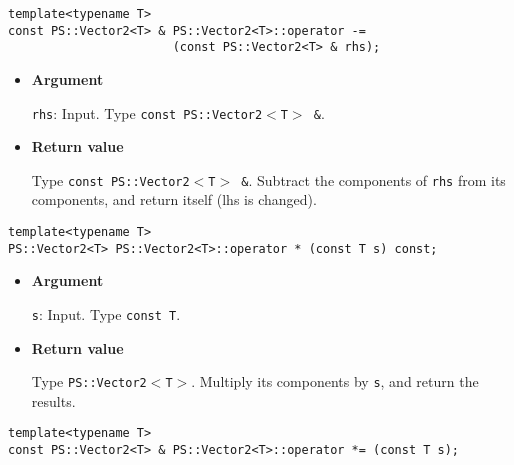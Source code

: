 \begin{screen}
\begin{verbatim}
template<typename T>
const PS::Vector2<T> & PS::Vector2<T>::operator -= 
                       (const PS::Vector2<T> & rhs);
\end{verbatim}
\end{screen}

\begin{itemize}

\item{{\bf Argument}}

\texttt{rhs}: Input. Type \texttt{const PS::Vector2$<$T$>$ \&}.

\item{{\bf Return value}}

Type \texttt{const PS::Vector2$<$T$>$ \&}. Subtract the components of \texttt{rhs} from
its components, and return itself (lhs is changed).

\end{itemize}


\begin{screen}
\begin{verbatim}
template<typename T>
PS::Vector2<T> PS::Vector2<T>::operator * (const T s) const;
\end{verbatim}
\end{screen}

\begin{itemize}

\item{{\bf Argument}}

\texttt{s}: Input. Type \texttt{const T}.

\item{{\bf Return value}}

Type \texttt{PS::Vector2$<$T$>$}. Multiply its components by \texttt{s}, and return
the results.

\end{itemize}

\begin{screen}
\begin{verbatim}
template<typename T>
const PS::Vector2<T> & PS::Vector2<T>::operator *= (const T s);
\end{verbatim}
\end{screen}

